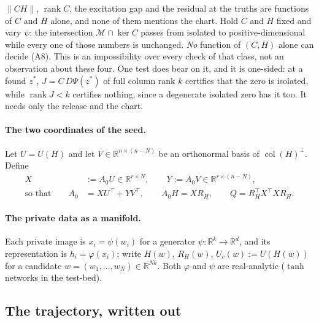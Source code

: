 \begin{remark}\label{rem:checks}
$\|CH\|$, $\operatorname{rank}C$, the excitation gap and the residual at the
truths are functions of $C$ and $H$ alone, and none of them mentions the chart.
Hold $C$ and $H$ fixed and vary $\psi$: the intersection $\mathcal M\cap\ker C$
passes from isolated to positive-dimensional while every one of those numbers
is unchanged. \emph{No} function of $(C,H)$ alone can decide (A8). This is an
impossibility over every check of that class, not an observation about these
four. One test does bear on it, and it is one-sided: at a found $z^\ast$,
$J=C\,D\Psi(z^\ast)$ of full column rank $k$ certifies that the zero is
isolated, while $\operatorname{rank}J<k$ certifies nothing, since a degenerate
isolated zero has it too. It needs only the release and the chart.
\end{remark}

\paragraph{The two coordinates of the seed.} Let $U=U(H)$ and let
$V\in\mathbb R^{n\times(n-N)}$ be an orthonormal basis of $\operatorname{col}(H)^\perp$.
Define
\begin{equation}\label{eq:XY}
\begin{aligned}
  X&:=A_0U\in\mathbb R^{r\times N},\qquad Y:=A_0V\in\mathbb R^{r\times(n-N)},\\
  \text{so that}\qquad A_0&=XU^{\!\top}+YV^{\!\top},\qquad A_0H=XR_H,\qquad
  Q=R_H^{\!\top}X^{\!\top}XR_H .
\end{aligned}
\end{equation}

\paragraph{The private data as a manifold.} Each private image is
$x_i=\psi(w_i)$ for a generator $\psi:\mathbb R^k\to\mathbb R^{d}$, and its
representation is $h_i=\varphi(x_i)$; write $H(w)$, $R_H(w)$, $U_c(w):=U(H(w))$
for a candidate $w=(w_1,\dots,w_N)\in\mathbb R^{Nk}$. Both $\varphi$ and
$\psi$ are real-analytic ($\tanh$ networks in the test-bed).

\subsection{The trajectory, written out}
\label{sec:trajectory}

